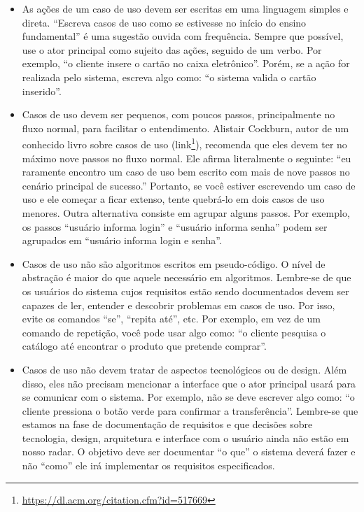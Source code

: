 \documentclass[
  11pt,
  twoside]{book}
\DeclareRobustCommand{\href}[2]{#2\footnote{\url{#1}}}
\begin{document}
\begin{itemize}
\item
  As ações de um caso de uso devem ser escritas em uma linguagem simples
  e direta. ``Escreva casos de uso como se estivesse no início do ensino
  fundamental'' é uma sugestão ouvida com frequência. Sempre que
  possível, use o ator principal como sujeito das ações, seguido de um
  verbo. Por exemplo, ``o cliente insere o cartão no caixa eletrônico''.
  Porém, se a ação for realizada pelo sistema, escreva algo como: ``o
  sistema valida o cartão inserido''.
\item
  Casos de uso devem ser pequenos, com poucos passos, principalmente no
  fluxo normal, para facilitar o entendimento. Alistair Cockburn,
   autor de um conhecido livro sobre casos de
  uso (\href{https://dl.acm.org/citation.cfm?id=517669}{link}),
  recomenda que eles devem ter no máximo nove passos no fluxo normal.
  Ele afirma literalmente o seguinte: ``eu raramente encontro um caso de
  uso bem escrito com mais de nove passos no cenário principal de
  sucesso.'' Portanto, se você estiver escrevendo um caso de uso e ele
  começar a ficar extenso, tente quebrá-lo em dois casos de uso menores.
  Outra alternativa consiste em agrupar alguns passos. Por exemplo, os
  passos ``usuário informa login'' e ``usuário informa senha'' podem ser
  agrupados em ``usuário informa login e senha''.
\item
  Casos de uso não são algoritmos escritos em pseudo-código. O nível de
  abstração é maior do que aquele necessário em algoritmos. Lembre-se de
  que os usuários do sistema cujos requisitos estão sendo documentados
  devem ser capazes de ler, entender e descobrir problemas em casos de
  uso. Por isso, evite os comandos ``se'', ``repita até'', etc. Por
  exemplo, em vez de um comando de repetição, você pode usar algo como:
  ``o cliente pesquisa o catálogo até encontrar o produto que pretende
  comprar''.
\item
  Casos de uso não devem tratar de aspectos tecnológicos ou de design.
  Além disso, eles não precisam mencionar a interface que o ator
  principal usará para se comunicar com o sistema. Por exemplo, não se
  deve escrever algo como: ``o cliente pressiona o botão verde para
  confirmar a transferência''. Lembre-se que estamos na fase de
  documentação de requisitos e que decisões sobre tecnologia, design,
  arquitetura e interface com o usuário ainda não estão em nosso radar.
  O objetivo deve ser documentar ``o que'' o sistema deverá fazer e não
  ``como'' ele irá implementar os requisitos especificados.

\end{itemize}
\end{document}
